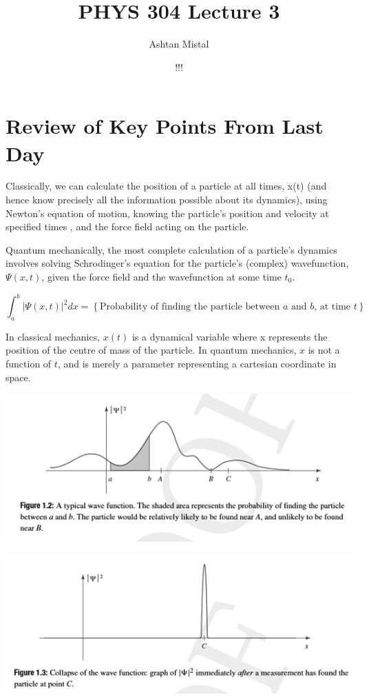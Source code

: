 \documentclass{article}
\title{PHYS 304 Lecture 3}
\author{Ashtan Mistal}
\date{!!!}
\begin{document}
\ifstandalone
\maketitle
\fi

\graphicspath{{./Lecture03/}}

\section{Review of Key Points From Last Day}

Classically, we can calculate the position of a particle at all times, x(t) (and hence know precisely all the information possible about its dynamics), using Newton’s equation of motion, knowing the particle’s position and velocity at specified times , and the force field acting on the particle.

Quantum mechanically, the most complete calculation of a particle’s dynamics involves solving Schrodinger's equation for the particle’s (complex) wavefunction,$ \Psi(x,t)$, given the force field and the wavefunction at some time $t_0$. 


$$\int_a^b |\Psi(x,t)|^2 dx = \left\{ \text{Probability of finding the particle between } a \text{ and } b \text{, at time } t \right\}$$

In classical mechanics, $x(t)$ is a dynamical variable where x represents the position of the centre of mass of the particle.  In quantum mechanics, $x$ is not a function of $t$, and is merely a parameter representing a cartesian coordinate in space.


\includegraphics[width = 0.7 \textwidth]{Lecture02/2.png}

\includegraphics[width = 0.7 \textwidth]{Lecture02/3.png}
\end{document}
